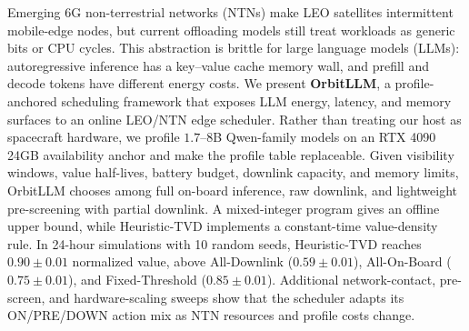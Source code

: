 Emerging 6G non-terrestrial networks (NTNs) make LEO satellites intermittent mobile-edge nodes, but current offloading models still treat workloads as generic bits or CPU cycles. This abstraction is brittle for large language models (LLMs): autoregressive inference has a key--value cache memory wall, and prefill and decode tokens have different energy costs. We present \textbf{OrbitLLM}, a profile-anchored scheduling framework that exposes LLM energy, latency, and memory surfaces to an online LEO/NTN edge scheduler. Rather than treating our host as spacecraft hardware, we profile $1.7$--$8$B Qwen-family models on an RTX 4090 24GB availability anchor and make the profile table replaceable. Given visibility windows, value half-lives, battery budget, downlink capacity, and memory limits, OrbitLLM chooses among full on-board inference, raw downlink, and lightweight pre-screening with partial downlink. A mixed-integer program gives an offline upper bound, while Heuristic-TVD implements a constant-time value-density rule. In 24-hour simulations with 10 random seeds, Heuristic-TVD reaches $0.90\pm0.01$ normalized value, above All-Downlink ($0.59\pm0.01$), All-On-Board ($0.75\pm0.01$), and Fixed-Threshold ($0.85\pm0.01$). Additional network-contact, pre-screen, and hardware-scaling sweeps show that the scheduler adapts its ON/PRE/DOWN action mix as NTN resources and profile costs change.
